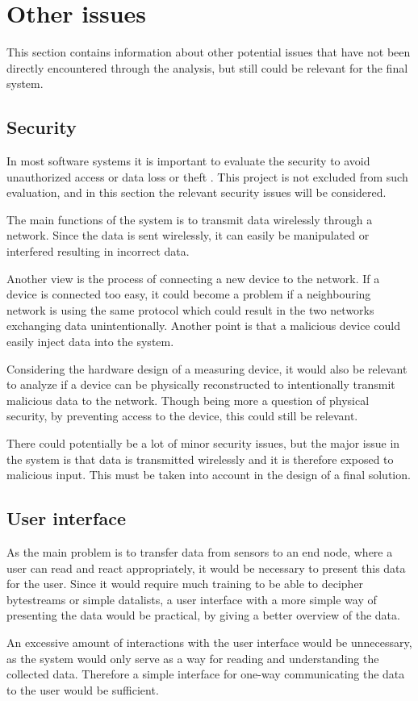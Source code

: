 \section{Other issues}
This section contains information about other potential issues that have not been directly encountered through the analysis, but still could be relevant for the final system.

\subsection{Security}
In most software systems it is important to evaluate the security to avoid unauthorized access or data loss or theft . This project is not excluded from such evaluation, and in this section the relevant security issues will be considered.

The main functions of the system is to transmit data wirelessly through a network. Since the data is sent wirelessly, it can easily be manipulated or interfered resulting in incorrect data.

Another view is the process of connecting a new device to the network. If a device is connected too easy, it could become a problem if a neighbouring network is using the same protocol which could result in the two networks exchanging data unintentionally. Another point is that a malicious device could easily inject data into the system.

Considering the hardware design of a measuring device, it would also be relevant to analyze if a device can be physically reconstructed to intentionally transmit malicious data to the network. Though being more a question of physical security, by preventing access to the device, this could still be relevant.

There could potentially be a lot of minor security issues, but the major issue in the system is that data is transmitted wirelessly and it is therefore exposed to malicious input. This must be taken into account in the design of a final solution.

\subsection{User interface}
As the main problem is to transfer data from sensors to an end node, where a user can read and react appropriately, it would be necessary to present this data for the user. Since it would require much training to be able to decipher bytestreams or simple datalists, a user interface with a more simple way of presenting the data would be practical, by giving a better overview of the data.

An excessive amount of interactions with the user interface would be unnecessary, as the system would only serve as a way for reading and understanding the collected data. Therefore a simple interface for one-way communicating the data to the user would be sufficient.
